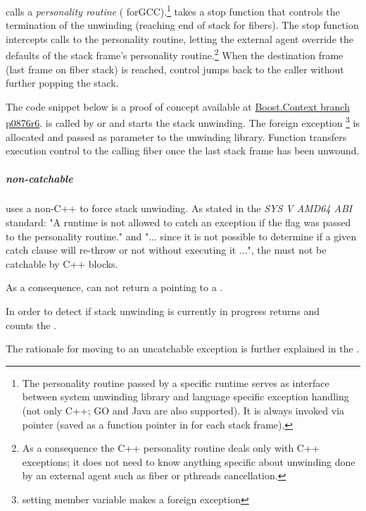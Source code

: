 \uwforced calls a \emph{personality routine} ( forGCC).\footnote{The
personality routine passed by a specific runtime serves as interface between system unwinding library
and language specific exception handling (not only C++; GO and Java are also supported). It is always invoked via pointer (saved
as a function pointer in \ehframe\xspace for each stack frame).}
\uwforced takes a stop function that controls the termination of the unwinding
(reaching end of stack for fibers).
The stop function intercepts calls to the personality routine, letting the external
agent override the defaults of the stack frame's personality routine.\footnote{As
a consequence the C++ personality routine deals only with C++ exceptions;
it does not need to know anything specific about unwinding done by an external
agent such as fiber or pthreads cancellation.}
When the destination frame (last frame on fiber
stack) is reached, control jumps back to the caller without further popping
the stack.

The code snippet below is a proof of concept available at \href{https://github.com/boostorg/context/tree/p0876r6}{Boost.Context branch p0876r6}.
 is called by \unwindfib or \dtor and starts the stack unwinding.
The foreign exception \footnote{setting member variable makes  a foreign exception}
is allocated and passed as parameter to the unwinding library. Function  transfers execution control
to the calling fiber once the last stack frame has been unwound.

\subparagraph{non-catchable \foreignex}
\unwindfib uses a non-C++ \foreignex to force stack unwinding.
As stated in the \emph{SYS V AMD64 ABI}\cite{SYSVAMD64} standard:
"A runtime is not allowed to catch an exception if the  flag was passed to the personality routine."
and "... since it is not possible to determine if a given catch clause will re-throw or not without executing it ...", the
\foreignex must not be catchable by C++  blocks.

As a consequence, \curex can not return a  pointing
to a \foreignex.

In order to detect if stack unwinding is currently in progress \uncex returns  and\\
\uncexs counts the \foreignex.

The rationale for moving to an uncatchable exception is further explained in
the .

